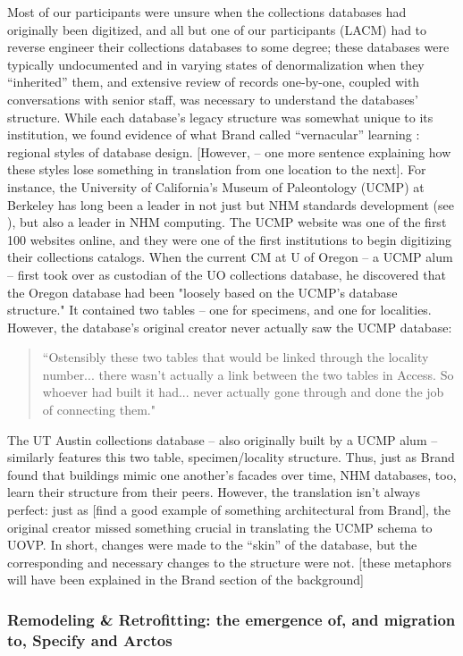 Most of our participants were unsure when the collections databases had originally been digitized, and all but one of our participants (LACM) had to reverse engineer their collections databases to some degree; these databases were typically undocumented and in varying states of denormalization when they “inherited” them, and extensive review of records one-by-one, coupled with conversations with senior staff, was necessary to understand the databases’ structure.  While each database’s legacy structure was somewhat unique to its institution, we found evidence of what Brand called “vernacular” learning \cite{brand1995buildings}: regional styles of database design. [However, -- one more sentence explaining how these styles lose something in translation from one location to the next]. For instance, the University of California’s Museum of Paleontology (UCMP) at Berkeley has long been a leader in not just but NHM standards development (see \cite{Star_1989}), but also a leader in NHM computing. The UCMP website was one of the first 100 websites online, and they were one of the first institutions to begin digitizing their collections catalogs. When the current CM at U of Oregon -- a UCMP alum -- first took over as custodian of the UO collections database, he discovered that the Oregon database had been "loosely based on the UCMP's database structure." It contained two tables -- one for specimens, and one for localities. However, the database’s original creator never actually saw the UCMP database:
\begin{quote}
“Ostensibly these two tables that would be linked through the locality number... there wasn't actually a link between the two tables in Access. So whoever had built it had... never actually gone through and done the job of connecting them."
\end{quote}
The UT Austin collections database – also originally built by a UCMP alum – similarly features this two table, specimen/locality structure. Thus, just as Brand found that buildings mimic one another’s facades over time, NHM databases, too, learn their structure from their peers. However, the translation isn’t always perfect: just as [find a good example of something architectural from Brand], the original creator missed something crucial in translating the UCMP schema to UOVP. In short, changes were made to the “skin” of the database, but the corresponding and necessary changes to the structure were not. [these metaphors will have been explained in the Brand section of the background] 

\subsubsection{Remodeling \& Retrofitting: the emergence of, and migration to, Specify and Arctos}

